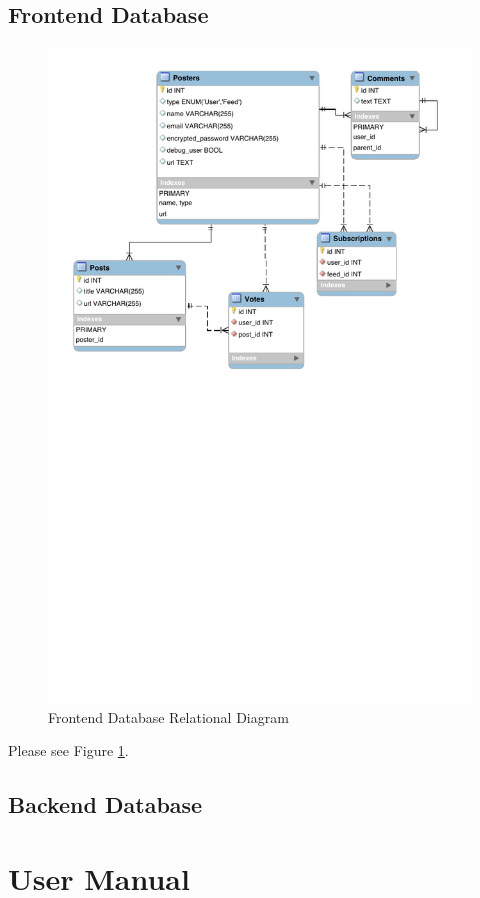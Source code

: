 \documentclass[11pt,letterpaper,titlepage]{article}
\begin{document}
\subsection{Frontend Database}
\begin{figure}
\centering
\includegraphics{db_diagram.pdf}
\caption{Frontend Database Relational Diagram}
\label{fig:database}
\end{figure}
Please see Figure \ref{fig:database}.
\subsection{Backend Database}

\section{User Manual}
\end{document}

